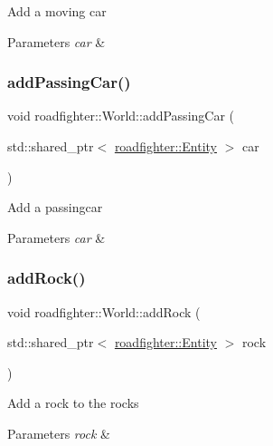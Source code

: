 Add a moving car 
\begin{DoxyParams}{Parameters}
{\em car} & \\
\hline
\end{DoxyParams}
\mbox{\label{classroadfighter_1_1World_ae9c77c5d9b4c5caeb74f417284572237}} 
\subsubsection{\texorpdfstring{add\+Passing\+Car()}{addPassingCar()}}
{\footnotesize\ttfamily void roadfighter\+::\+World\+::add\+Passing\+Car (\begin{DoxyParamCaption}\item[{std\+::shared\+\_\+ptr$<$ \hyperlink{classroadfighter_1_1Entity}{roadfighter\+::\+Entity} $>$}]{car }\end{DoxyParamCaption})}

Add a passingcar 
\begin{DoxyParams}{Parameters}
{\em car} & \\
\hline
\end{DoxyParams}
\mbox{\label{classroadfighter_1_1World_a7c36c25f62dcb8869f97448f7382d2df}} 
\subsubsection{\texorpdfstring{add\+Rock()}{addRock()}}
{\footnotesize\ttfamily void roadfighter\+::\+World\+::add\+Rock (\begin{DoxyParamCaption}\item[{std\+::shared\+\_\+ptr$<$ \hyperlink{classroadfighter_1_1Entity}{roadfighter\+::\+Entity} $>$}]{rock }\end{DoxyParamCaption})}

Add a rock to the rocks 
\begin{DoxyParams}{Parameters}
{\em rock} & \\
\hline
\end{DoxyParams}
\mbox{\label{classroadfighter_1_1World_aae11d52bce048722267d7d0515c69985}} 
